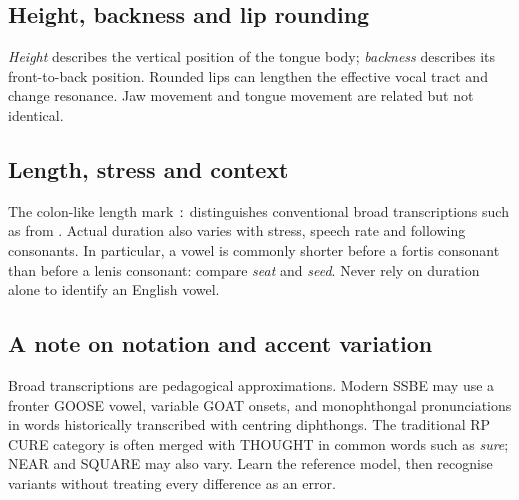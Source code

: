 \subsection{Height, backness and lip rounding}
\emph{Height} describes the vertical position of the tongue body; \emph{backness} describes its front-to-back position. Rounded lips can lengthen the effective vocal tract and change resonance. Jaw movement and tongue movement are related but not identical.
\subsection{Length, stress and context}
The colon-like length mark \texttt{ː} distinguishes conventional broad transcriptions such as  from . Actual duration also varies with stress, speech rate and following consonants. In particular, a vowel is commonly shorter before a fortis consonant than before a lenis consonant: compare \emph{seat} and \emph{seed}. Never rely on duration alone to identify an English vowel.
\subsection{A note on notation and accent variation}
Broad transcriptions are pedagogical approximations. Modern SSBE may use a fronter GOOSE vowel, variable GOAT onsets, and monophthongal pronunciations in words historically transcribed with centring diphthongs. The traditional RP CURE category  is often merged with THOUGHT  in common words such as \emph{sure}; NEAR and SQUARE may also vary. Learn the reference model, then recognise variants without treating every difference as an error.
